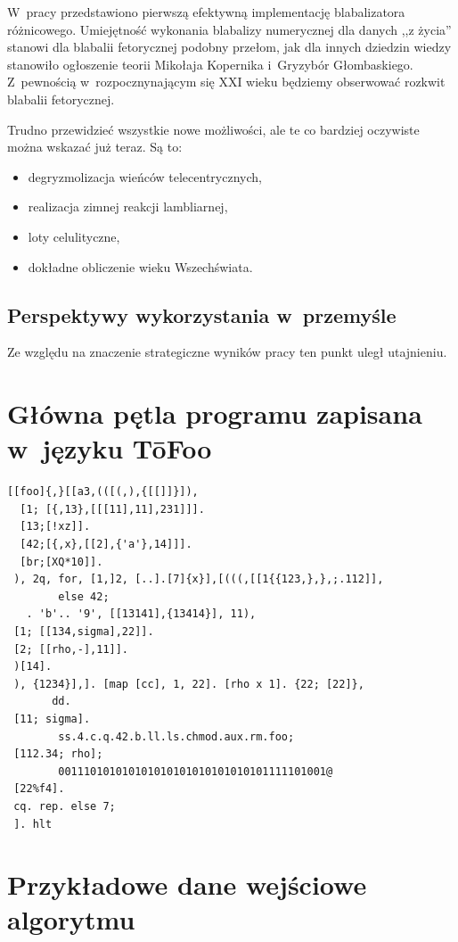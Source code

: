 W~pracy przedstawiono pierwszą efektywną implementację blabalizatora
różnicowego.  Umiejętność wykonania blabalizy numerycznej dla danych
,,z życia'' stanowi dla blabalii fetorycznej podobny przełom, jak dla
innych dziedzin wiedzy stanowiło ogłoszenie teorii Mikołaja Kopernika
i~Gryzybór Głombaskiego.  Z~pewnością w~rozpocznynającym się XXI wieku
będziemy obserwować rozkwit blabalii fetorycznej.

Trudno przewidzieć wszystkie nowe możliwości, ale te co bardziej
oczywiste można wskazać już teraz.  Są to:
\begin{itemize}
\item degryzmolizacja wieńców telecentrycznych,
\item realizacja zimnej reakcji lambliarnej,
\item loty celulityczne,
\item dokładne obliczenie wieku Wszechświata.
\end{itemize}

\section{Perspektywy wykorzystania w~przemyśle}

Ze względu na znaczenie strategiczne wyników pracy ten punkt uległ
utajnieniu.

\appendix

\chapter{Główna pętla programu zapisana w~języku T\=oFoo}

\begin{verbatim}
[[foo]{,}[[a3,(([(,),{[[]]}]),
  [1; [{,13},[[[11],11],231]]].
  [13;[!xz]].
  [42;[{,x},[[2],{'a'},14]]].
  [br;[XQ*10]].
 ), 2q, for, [1,]2, [..].[7]{x}],[(((,[[1{{123,},},;.112]],
        else 42;
   . 'b'.. '9', [[13141],{13414}], 11),
 [1; [[134,sigma],22]].
 [2; [[rho,-],11]].
 )[14].
 ), {1234}],]. [map [cc], 1, 22]. [rho x 1]. {22; [22]},
       dd.
 [11; sigma].
        ss.4.c.q.42.b.ll.ls.chmod.aux.rm.foo;
 [112.34; rho];
        001110101010101010101010101010101111101001@
 [22%f4].
 cq. rep. else 7;
 ]. hlt
\end{verbatim}

\chapter{Przykładowe dane wejściowe algorytmu}

